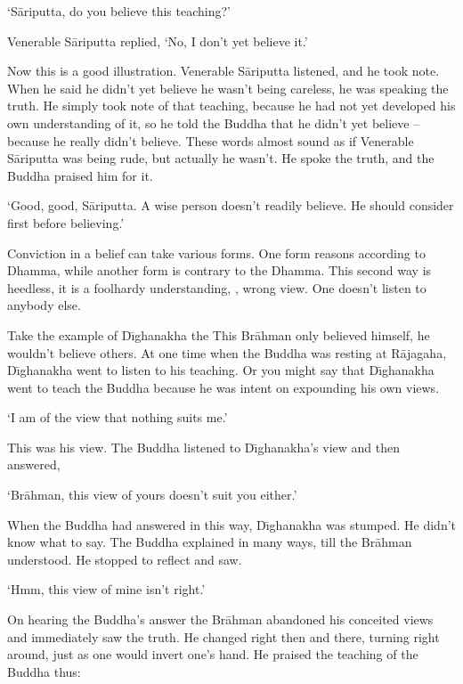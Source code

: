 `S\=ariputta, do you believe this teaching?'

Venerable S\=ariputta replied, `No, I don't yet believe it.'

Now this is a good illustration. Venerable S\=ariputta listened, and he took note. When he said he didn't yet believe he wasn't being careless, he was speaking the truth. He simply took note of that teaching, because he had not yet developed his own understanding of it, so he told the Buddha that he didn't yet believe -- because he really didn't believe. These words almost sound as if Venerable S\=ariputta was being rude, but actually he wasn't. He spoke the truth, and the Buddha praised him for it.

`Good, good, S\=ariputta. A wise person doesn't readily believe. He should consider first before believing.'

Conviction in a belief can take various forms. One form reasons according to Dhamma, while another form is contrary to the Dhamma. This second way is heedless, it is a foolhardy understanding, , wrong view. One doesn't listen to anybody else.

Take the example of D\={\i}ghanakha the  This Br\=ahman only believed himself, he wouldn't believe others. At one time when the Buddha was resting at R\=ajagaha, D\={\i}ghanakha went to listen to his teaching. Or you might say that D\={\i}ghanakha went to teach the Buddha because he was intent on expounding his own views.

`I am of the view that nothing suits me.'

This was his view. The Buddha listened to D\={\i}ghanakha's view and then answered,

`Br\=ahman, this view of yours doesn't suit you either.'

When the Buddha had answered in this way, D\={\i}ghanakha was stumped. He didn't know what to say. The Buddha explained in many ways, till the Br\=ahman understood. He stopped to reflect and saw.

`Hmm, this view of mine isn't right.'

On hearing the Buddha's answer the Br\=ahman abandoned his conceited views and immediately saw the truth. He changed right then and there, turning right around, just as one would invert one's hand. He praised the teaching of the Buddha thus:

